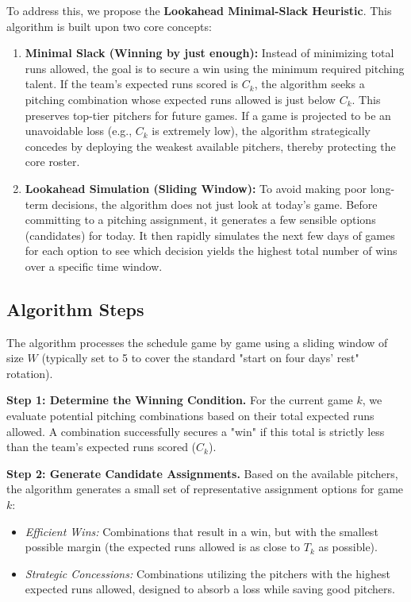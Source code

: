 \documentclass[11pt, a4paper]{article}
\begin{document}
To address this, we propose the \textbf{Lookahead Minimal-Slack Heuristic}. This algorithm is built upon two core concepts:
\begin{enumerate}
    \item \textbf{Minimal Slack (Winning by just enough):} Instead of minimizing total runs allowed, the goal is to secure a win using the minimum required pitching talent. If the team's expected runs scored is $C_k$, the algorithm seeks a pitching combination whose expected runs allowed is just below $C_k$. This preserves top-tier pitchers for future games. If a game is projected to be an unavoidable loss (e.g., $C_k$ is extremely low), the algorithm strategically concedes by deploying the weakest available pitchers, thereby protecting the core roster.
    \item \textbf{Lookahead Simulation (Sliding Window):} To avoid making poor long-term decisions, the algorithm does not just look at today's game. Before committing to a pitching assignment, it generates a few sensible options (candidates) for today. It then rapidly simulates the next few days of games for each option to see which decision yields the highest total number of wins over a specific time window.
\end{enumerate}

\subsection{Algorithm Steps}
The algorithm processes the schedule game by game using a sliding window of size $W$ (typically set to 5 to cover the standard "start on four days' rest" rotation).

\textbf{Step 1: Determine the Winning Condition.} For the current game $k$, we evaluate potential pitching combinations based on their total expected runs allowed.
A combination successfully secures a "win" if this total is strictly less than the team's expected runs scored ($C_k$).

\textbf{Step 2: Generate Candidate Assignments.} Based on the available pitchers, the algorithm generates a small set of representative assignment options for game $k$:
\begin{itemize}
    \item \textit{Efficient Wins:} Combinations that result in a win, but with the smallest possible margin (the expected runs allowed is as close to $T_k$ as possible).
    \item \textit{Strategic Concessions:} Combinations utilizing the pitchers with the highest expected runs allowed, designed to absorb a loss while saving good pitchers.
\end{itemize}
\end{document}
